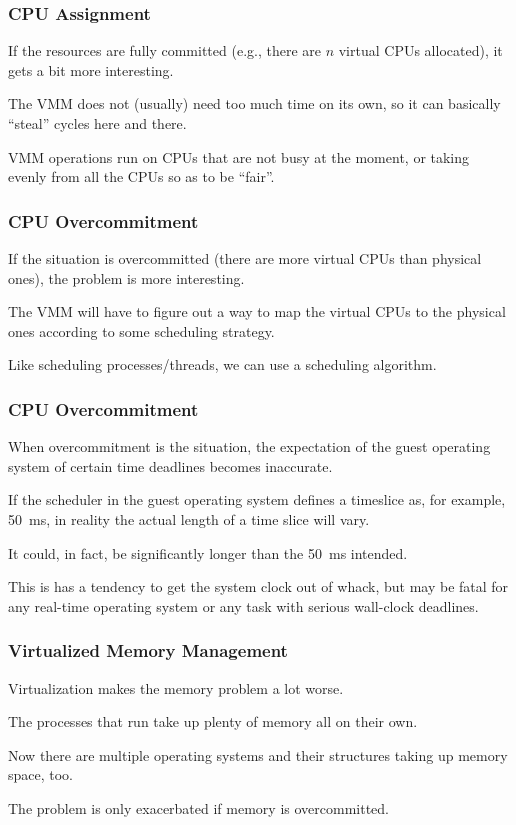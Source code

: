 \begin{frame}
\frametitle{CPU Assignment}

If the resources are fully committed (e.g., there are $n$ virtual CPUs allocated), it gets a bit more interesting. 

The VMM does not (usually) need too much time on its own, so it can basically ``steal'' cycles here and there. 

VMM operations run on CPUs that are not busy at the moment, or taking evenly from all the CPUs so as to be ``fair''. 


\end{frame}

\begin{frame}
\frametitle{CPU Overcommitment}

If the situation is overcommitted (there are more virtual CPUs than physical ones), the problem is more interesting. 

The VMM will have to figure out a way to map the virtual CPUs to the physical ones according to some scheduling strategy. 

Like scheduling processes/threads, we can use a scheduling algorithm.

\end{frame}

\begin{frame}
\frametitle{CPU Overcommitment}

When overcommitment is the situation, the expectation of the guest operating system of certain time deadlines becomes inaccurate. 

If the scheduler in the guest operating system defines a timeslice as, for example, 50~ms, in reality the actual length of a time slice will vary. 

It could, in fact, be significantly longer than the 50~ms intended. 

This is has a tendency to get the system clock out of whack, but may be fatal for any real-time operating system or any task with serious wall-clock deadlines.

\end{frame}

\begin{frame}
\frametitle{Virtualized Memory Management}

Virtualization makes the memory problem a lot worse.

The processes that run take up plenty of memory all on their own. 

Now there are multiple operating systems and their structures taking up memory space, too. 

The problem is only exacerbated if memory is overcommitted.

\end{frame}


